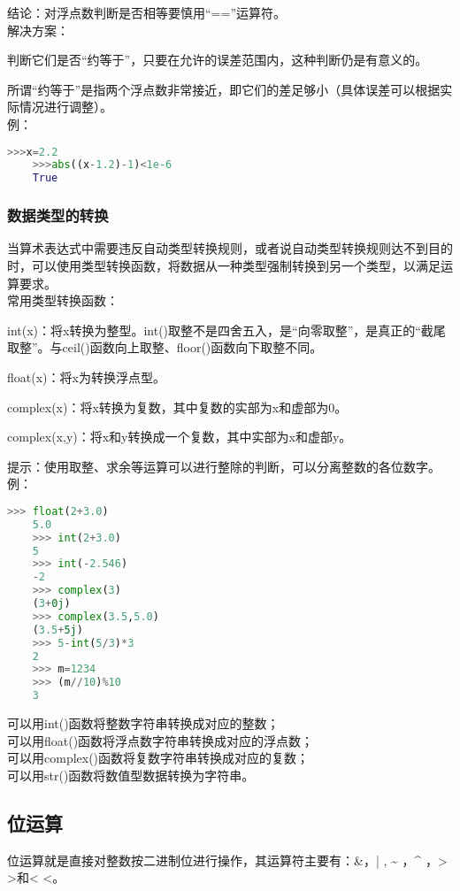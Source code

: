 \documentclass[11pt,a4paper]{article}
\begin{document}
结论：对浮点数判断是否相等要慎用“==”运算符。\\
解决方案：

判断它们是否“约等于”，只要在允许的误差范围内，这种判断仍是有意义的。

所谓“约等于”是指两个浮点数非常接近，即它们的差足够小（具体误差可以根据实际情况进行调整）。\\
例：
\begin{lstlisting}[language={Python}]
    >>>x=2.2
    >>>abs((x-1.2)-1)<1e-6
    True
\end{lstlisting}

\subsubsection{数据类型的转换}

当算术表达式中需要违反自动类型转换规则，或者说自动类型转换规则达不到目的时，可以使用类型转换函数，将数据从一种类型强制转换到另一个类型，以满足运算要求。\\
常用类型转换函数：

int(x)：将x转换为整型。int()取整不是四舍五入，是“向零取整”，是真正的“截尾取整”。与ceil()函数向上取整、floor()函数向下取整不同。

float(x)：将x为转换浮点型。

complex(x)：将x转换为复数，其中复数的实部为x和虚部为0。

complex(x,y)：将x和y转换成一个复数，其中实部为x和虚部y。

提示：使用取整、求余等运算可以进行整除的判断，可以分离整数的各位数字。\\
例：
\begin{lstlisting}[language={Python}]
    >>> float(2+3.0)
    5.0
    >>> int(2+3.0)
    5
    >>> int(-2.546)
    -2
    >>> complex(3)
    (3+0j)
    >>> complex(3.5,5.0)
    (3.5+5j)
    >>> 5-int(5/3)*3
    2
    >>> m=1234
    >>> (m//10)%10
    3
\end{lstlisting}
可以用int()函数将整数字符串转换成对应的整数；\\
可以用float()函数将浮点数字符串转换成对应的浮点数；\\
可以用complex()函数将复数字符串转换成对应的复数；\\
可以用str()函数将数值型数据转换为字符串。

\subsection{位运算}

位运算就是直接对整数按二进制位进行操作，其运算符主要有：\&，| , \~{} ，\^{} ，> >和< <。
\end{document}
